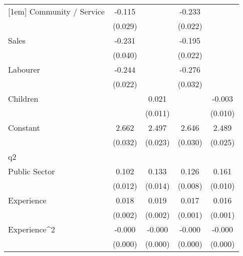 {\begin{tabular}{l*{4}{c}}
[1em]
Community / Service &      -0.115\sym{***}&                     &      -0.233\sym{***}&                     \\
                    &     (0.029)         &                     &     (0.022)         &                     \\
[1em]
Sales               &      -0.231\sym{***}&                     &      -0.195\sym{***}&                     \\
                    &     (0.040)         &                     &     (0.022)         &                     \\
[1em]
Labourer            &      -0.244\sym{***}&                     &      -0.276\sym{***}&                     \\
                    &     (0.022)         &                     &     (0.032)         &                     \\
[1em]
Children            &                     &       0.021         &                     &      -0.003         \\
                    &                     &     (0.011)         &                     &     (0.010)         \\
[1em]
Constant            &       2.662\sym{***}&       2.497\sym{***}&       2.646\sym{***}&       2.489\sym{***}\\
                    &     (0.032)         &     (0.023)         &     (0.030)         &     (0.025)         \\
\hline
q2                  &                     &                     &                     &                     \\
Public Sector       &       0.102\sym{***}&       0.133\sym{***}&       0.126\sym{***}&       0.161\sym{***}\\
                    &     (0.012)         &     (0.014)         &     (0.008)         &     (0.010)         \\
[1em]
Experience          &       0.018\sym{***}&       0.019\sym{***}&       0.017\sym{***}&       0.016\sym{***}\\
                    &     (0.002)         &     (0.002)         &     (0.001)         &     (0.001)         \\
[1em]
Experience^{2}      &      -0.000\sym{***}&      -0.000\sym{***}&      -0.000\sym{***}&      -0.000\sym{***}\\
                    &     (0.000)         &     (0.000)         &     (0.000)         &     (0.000)         \\

\end{tabular}}
